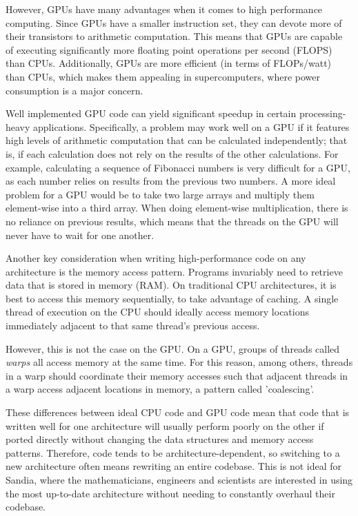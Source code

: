 However, GPUs have many advantages when it comes to high performance computing.
Since GPUs have a smaller instruction set, they can devote more of their
transistors to arithmetic computation. This means that GPUs are capable of
executing significantly more floating point operations per second (FLOPS) than
CPUs. Additionally, GPUs are more efficient (in terms of FLOPs/watt) than CPUs, which makes them appealing
in supercomputers, where power consumption is a major concern.

Well implemented GPU code can yield significant speedup in certain
processing-heavy applications. Specifically, a problem may work well on a GPU if
it features high levels of arithmetic computation that can be calculated
independently; that is, if each calculation does not rely on the results of the other
calculations. For example, calculating a sequence of Fibonacci numbers is very
difficult for a GPU, as each number relies on results from the previous two numbers. A 
more ideal problem for a GPU would be to take two large arrays
and multiply them element-wise into a third array. When doing element-wise multiplication,
there is no reliance on previous results, which means that the threads on the GPU will
never have to wait for one another.

Another key consideration when writing high-performance code on any architecture
is the memory access pattern. Programs invariably need to retrieve data that is
stored in memory (RAM). On traditional CPU architectures, it is best to access
this memory sequentially, to take advantage of caching. A single thread of
execution on the CPU should ideally access memory locations immediately adjacent
to that same thread's previous access.

However, this is not the case on the GPU. On a GPU, groups of threads called
\emph{warps} all access memory at the same time. For this reason, among others, threads in a warp
should coordinate their memory accesses such that adjacent threads in
a warp access adjacent locations in memory, a pattern called 'coalescing'.

These differences between ideal CPU code and GPU code mean that code that is
written well for one architecture will usually perform poorly on the other if
ported directly without changing the data structures and memory access patterns.
Therefore, code tends to be architecture-dependent, so switching to a new
architecture often means rewriting an entire codebase. This is not ideal for
Sandia, where the mathematicians, engineers and scientists are interested in 
using the most up-to-date architecture without
needing to constantly overhaul their codebase.

